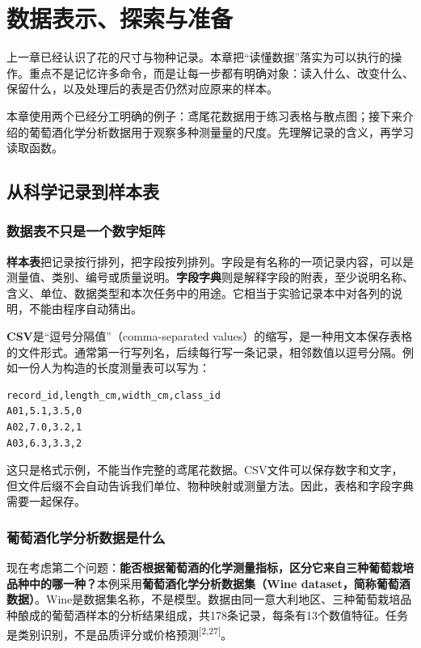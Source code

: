\chapter{数据表示、探索与准备}
\label{chap:data}

上一章已经认识了花的尺寸与物种记录。本章把“读懂数据”落实为可以执行的操作。重点不是记忆许多命令，而是让每一步都有明确对象：读入什么、改变什么、保留什么，以及处理后的表是否仍然对应原来的样本。

本章使用两个已经分工明确的例子：鸢尾花数据用于练习表格与散点图；接下来介绍的葡萄酒化学分析数据用于观察多种测量量的尺度。先理解记录的含义，再学习读取函数。

\section{从科学记录到样本表}
\subsection{数据表不只是一个数字矩阵}
\textbf{样本表}把记录按行排列，把字段按列排列。字段是有名称的一项记录内容，可以是测量值、类别、编号或质量说明。\textbf{字段字典}则是解释字段的附表，至少说明名称、含义、单位、数据类型和本次任务中的用途。它相当于实验记录本中对各列的说明，不能由程序自动猜出。

\textbf{CSV}是“逗号分隔值”（comma-separated values）的缩写，是一种用文本保存表格的文件形式。通常第一行写列名，后续每行写一条记录，相邻数值以逗号分隔。例如一份人为构造的长度测量表可以写为：
\begin{lstlisting}[language={},caption={用于理解CSV格式的人工三行示例，长度单位为厘米}]
record_id,length_cm,width_cm,class_id
A01,5.1,3.5,0
A02,7.0,3.2,1
A03,6.3,3.3,2
\end{lstlisting}
这只是格式示例，不能当作完整的鸢尾花数据。CSV文件可以保存数字和文字，但文件后缀不会自动告诉我们单位、物种映射或测量方法。因此，表格和字段字典需要一起保存。

\subsection{葡萄酒化学分析数据是什么}
\label{sec:wine-intro}
现在考虑第二个问题：\textbf{能否根据葡萄酒的化学测量指标，区分它来自三种葡萄栽培品种中的哪一种？}本例采用\textbf{葡萄酒化学分析数据集（Wine dataset，简称葡萄酒数据）}。Wine是数据集名称，不是模型。数据由同一意大利地区、三种葡萄栽培品种酿成的葡萄酒样本的分析结果组成，共178条记录，每条有13个数值特征。任务是类别识别，不是品质评分或价格预测\textsuperscript{[2,27]}。

